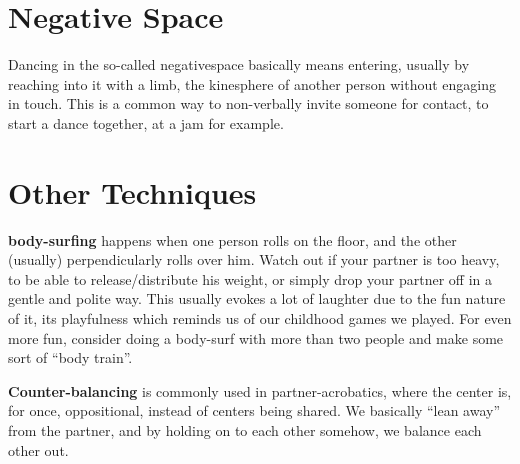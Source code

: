 
\section{Negative Space}\label{sec:negative-space}

Dancing in the so-called \gls{negativespace} basically means entering, usually by reaching into it with a limb, the \gls{kinesphere} of another person without engaging in touch.
This is a common way to non-verbally invite someone for contact, to start a dance together, at a jam for example.

\section{Other Techniques}\label{sec:other-techniques}

\textbf{\Gls{body-surfing}} happens when one person rolls on the floor, and the other (usually) perpendicularly rolls over him.
Watch out if your partner is too heavy, to be able to release/distribute his weight, or simply drop your partner off in a gentle and polite way.
This usually evokes a lot of laughter due to the fun nature of it, its playfulness which reminds us of our childhood games we played.
For even more fun, consider doing a body-surf with more than two people and make some sort of ``body train''.

\textbf{Counter-balancing} is commonly used in partner-acrobatics, where the center is, for once, oppositional, instead of centers being shared.
We basically ``lean away'' from the partner, and by holding on to each other somehow, we balance each other out.
